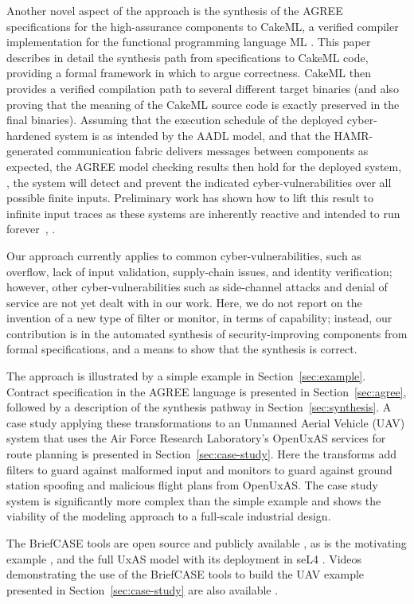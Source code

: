 Another novel aspect of the approach is the synthesis of the AGREE
specifications for the high-assurance components to CakeML, a verified
compiler implementation for the functional programming language
ML \cite{cakeml}. This paper describes in detail the synthesis path
from specifications to CakeML code, providing a formal framework in
which to argue correctness. CakeML then provides a verified
compilation path to several different target binaries (and also
proving that the meaning of the CakeML source code is exactly
preserved in the final binaries). Assuming that the execution schedule
of the deployed cyber-hardened system is as intended by the AADL
model, and that the HAMR-generated communication fabric delivers
messages between components as expected, the AGREE model checking
results then hold for the deployed system, \ie, the system will detect
and prevent the indicated cyber-vulnerabilities over all possible
finite inputs. Preliminary work has shown how to lift this result to
infinite input traces as these systems are inherently reactive and
intended to run forever~\cite{case-verified-filter}, \cite{cakeml-space-cost}.

Our approach currently applies to common cyber-vulnerabilities, such
as overflow, lack of input validation, supply-chain issues, and
identity verification; however, other cyber-vulnerabilities such as
side-channel attacks and denial of service are not yet dealt with in
our work.  Here, we do not report on the invention of a new type of
filter or monitor, in terms of capability; instead, our contribution
is in the automated synthesis of security-improving components from
formal specifications, and a means to show that the synthesis is
correct.

The approach is illustrated by a simple example in
Section~\ref{sec:example}. Contract specification in the AGREE
language is presented in Section~\ref{sec:agree}, followed by a
description of the synthesis pathway in Section~\ref{sec:synthesis}. A
case study applying these transformations to an Unmanned Aerial
Vehicle (UAV) system that uses the Air Force Research Laboratory's
OpenUxAS services for route planning is presented in
Section~\ref{sec:case-study}. Here the transforms add filters to guard
against malformed input and monitors to guard against ground station
spoofing and malicious flight plans from OpenUxAS. The case study
system is significantly more complex than the simple example and shows
the viability of the modeling approach to a full-scale industrial
design.

The BriefCASE tools are open source and publicly
available \cite{fmide}, as is the motivating example \cite{repo}, and
the full UxAS model with its deployment in seL4 \cite{phase2, camkes}.
Videos demonstrating the use of the BriefCASE tools to build the UAV
example presented in Section~\ref{sec:case-study} are also
available \cite{case}.
